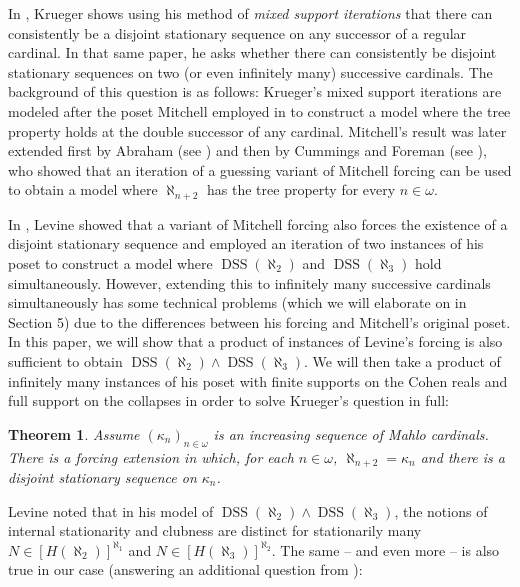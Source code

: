 \documentclass[12pt]{amsart}
\theoremstyle{definition}
\theoremstyle{remark}
\theoremstyle{plain}
\newtheorem{mysenx}{Theorem}
\numberwithin{mydef}{section}
\DeclareMathOperator{\DSS}{DSS}
\begin{document}
	In \cite{KruegerApplicMSI}, Krueger shows using his method of \emph{mixed support iterations} that there can consistently be a disjoint stationary sequence on any successor of a regular cardinal. In that same paper, he asks whether there can consistently be disjoint stationary sequences on two (or even infinitely many) successive cardinals. The background of this question is as follows: Krueger's mixed support iterations are modeled after the poset Mitchell employed in \cite{MitchellTreeProp} to construct a model where the tree property holds at the double successor of any cardinal. Mitchell's result was later extended first by Abraham (see \cite{AbrahamTrees}) and then by Cummings and Foreman (see \cite{CumForeTreeProp}), who showed that an iteration of a guessing variant of Mitchell forcing can be used to obtain a model where $\aleph_{n+2}$ has the tree property for every $n\in\omega$.
	
	In \cite{LevineDisjointStatSeq}, Levine showed that a variant of Mitchell forcing also forces the existence of a disjoint stationary sequence and employed an iteration of two instances of his poset to construct a model where $\DSS(\aleph_2)$ and $\DSS(\aleph_3)$ hold simultaneously. However, extending this to infinitely many successive cardinals simultaneously has some technical problems (which we will elaborate on in Section 5) due to the differences between his forcing and Mitchell's original poset. In this paper, we will show that a product of instances of Levine's forcing is also sufficient to obtain $\DSS(\aleph_2)\wedge\DSS(\aleph_3)$. We will then take a product of infinitely many instances of his poset with finite supports on the Cohen reals and full support on the collapses in order to solve Krueger's question in full:
	
	\begin{mysenx}\label{Thm1}
		Assume $(\kappa_n)_{n\in\omega}$ is an increasing sequence of Mahlo cardinals. There is a forcing extension in which, for each $n\in\omega$, $\aleph_{n+2}=\kappa_n$ and there is a disjoint stationary sequence on $\kappa_n$.
	\end{mysenx}
	
	Levine noted that in his model of $\DSS(\aleph_2)\wedge\DSS(\aleph_3)$, the notions of internal stationarity and clubness are distinct for stationarily many $N\in[H(\aleph_2)]^{\aleph_1}$ and $N\in[H(\aleph_3)]^{\aleph_2}$. The same -- and even more -- is also true in our case (answering an additional question from \cite{KruegerApplicMSI}):
	
\end{document}
